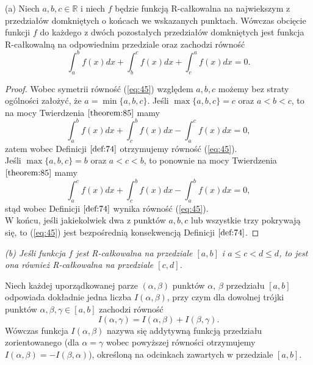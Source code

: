 \documentclass[leqno]{article}
\begin{document}
\begin{justify}
\begin{wniosek}
{
(a) Niech $a,b,c \in \mathbb{R}$ i niech $f$ będzie funkcją R-całkowalna na najwiekszym z przedziałów
domkniętych o końcach we wskazanych punktach. Wówczas obcięcie funkcji $f$ do każdego z dwóch pozostałych przedziałów domkniętych jest
funkcja R-całkowalną na odpowiednim przedziale oraz zachodzi równość
\begin{equation}\label{eq:45}
    \int_{a}^{b}f(x)dx + \int_{b}^{c}f(x)dx + \int_{c}^{a}f(x)dx = 0.
\end{equation}
}
\end{wniosek}
\begin{proof}
    Wobec symetrii równość (\ref{eq:45}) względem $a, b, c$ możemy bez straty ogólności założyć, że
    $a = \min{\{a,b,c\}}$. Jeśli $\max{\{a,b,c\} = c}$ oraz $a < b < c$, to na mocy
    Twierdzenia $\ref{theorem:85}$ mamy
    \[
        \int_{a}^{b}f(x)dx + \int_{c}^{b}f(x)dx - \int_{a}^{c}f(x)dx = 0,
    \]
    zatem wobec Definicji $\ref{def:74}$ otrzymujemy równość (\ref{eq:45}). \\
    Jeśli $\max{\{a,b,c\} = b}$ oraz $a < c < b$, to ponownie na mocy Twierdzenia
    $\ref{theorem:85}$ mamy
    \[
        \int_{a}^{c}f(x)dx + \int_{c}^{b}f(x)dx - \int_{a}^{b}f(x)dx = 0,
    \]
    stąd wobec Definicji $\ref{def:74}$ wynika równość (\ref{eq:45}). \\
    W końcu, jeśli jakiekolwiek dwa z punktów $a,b,c$ lub wszystkie trzy pokrywają się,
    to (\ref{eq:45}) jest bezpośrednią konsekwencją Definicji $\ref{def:74}$.
\end{proof}

\noindent
\textit
{
(b) Jeśli funkcja $f$ jest R-całkowalna na przedziale $[a,b]$ i $a \leqslant c < d \leqslant d$, to jest
ona również R-całkowalna na przedziale $[c,d]$.
}

\begin{defn}
    Niech każdej uporządkowanej parze $(\alpha, \beta)$ punktów $\alpha$, $\beta$ przedziału
    $[a,b]$ odpowiada dokładnie jedna liczba $I(\alpha, \beta)$, przy czym dla dowolnej trójki punktów
    $\alpha, \beta, \gamma \in [a,b]$ zachodzi równość
    \[
        I(\alpha, \gamma) = I(\alpha, \beta) + I(\beta, \gamma).
    \]
    Wówczas funkcja $I(\alpha, \beta)$ nazywa się addytywną funkcją przedziału zorientowanego
    (dla $\alpha = \gamma$ wobec powyższej równości otrzymujemy $I(\alpha, \beta) = -I(\beta, \alpha)$), 
    określoną na odcinkach zawartych w przedziale $[a,b]$. 
\end{defn}


\end{justify}
\end{document}
